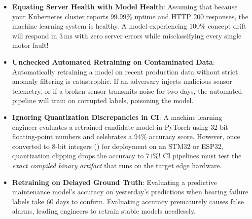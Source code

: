 \begin{warning}
\begin{itemize}
    \item \textbf{Equating Server Health with Model Health}:
    Assuming that because your Kubernetes cluster reports $99.99\%$ uptime and HTTP 200 responses, the machine learning system is healthy. A model experiencing $100\%$ concept drift will respond in $3\,\text{ms}$ with zero server errors while misclassifying every single motor fault!
    \item \textbf{Unchecked Automated Retraining on Contaminated Data}:
    Automatically retraining a model on recent production data without strict anomaly filtering is catastrophic. If an adversary injects malicious sensor telemetry, or if a broken sensor transmits noise for two days, the automated pipeline will train on corrupted labels, poisoning the model.
    \item \textbf{Ignoring Quantization Discrepancies in CI}:
    A machine learning engineer evaluates a retrained candidate model in PyTorch using 32-bit floating-point numbers and celebrates a $94\%$ accuracy score. However, once converted to 8-bit integers () for deployment on an STM32 or ESP32, quantization clipping drops the accuracy to $71\%$! CI pipelines must test the \emph{exact compiled binary artifact} that runs on the target edge hardware.
    \item \textbf{Retraining on Delayed Ground Truth}:
    Evaluating a predictive maintenance model's accuracy on yesterday's predictions when bearing failure labels take 60 days to confirm. Evaluating accuracy prematurely causes false alarms, leading engineers to retrain stable models needlessly.
\end{itemize}
\end{warning}

